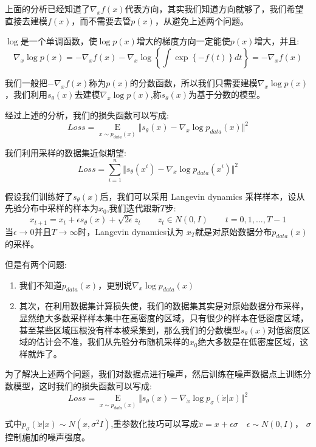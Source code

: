 \documentclass[withoutpreface,bwprint]{cumcmthesis} %
\begin{document}
	上面的分析已经知道了$\nabla_{x} f(x)$代表方向，其实我们知道方向就够了，我们希望直接去建模$f(x)$，而不需要去管$p(x)$，从避免上述两个问题。
	
	$\log$是一个单调函数，使$\log p(x)$增大的梯度方向一定能使$p(x)$增大，并且:
	$$
		\nabla_{x} \log p(x) = - \nabla_x f(x) - \nabla_x \log \left\{ \int \exp \left\{ -f(t) \right\} dt \right\} = - \nabla_{x} f(x) 
	$$
	
	我们一般把$-\nabla_{x} f(x)$称为$p(x)$的分数函数，所以我们只需要建模$\nabla_{x} \log p(x)$，我们利用$s_{\theta}(x)$去建模$\nabla_{x} \log p(x)$,称$s_{\theta}(x)$为基于分数的模型。
	
	经过上述的分析，我们的损失函数可以写成:
	$$
		Loss =  \mathop{E}\limits_{ x \sim p_{data}(x) } \Vert s_{\theta}(x) - \nabla_{x} \log p_{data}(x) \Vert^2
	$$
	
	我们利用采样的数据集近似期望:
	\begin{equation}
		Loss = \sum_{i=1}^{n} \Vert s_{\theta}(x^i) - \nabla_{x} \log p_{data}(x^i) \Vert^2
	\end{equation}

	假设我们训练好了$s_{\theta}(x)$后，我们可以采用 Langevin dynamics 采样样本，设从先验分布中采样的样本为$x_0$,我们迭代跟新$T$步:
	$$
		x_{t+1}=x_{t}+ \epsilon s_{\theta}(x) +\sqrt{2\epsilon} z_t    \quad \quad z_t \in N(0,I)   \quad \quad  t=0,1,...,T-1   
	$$
	当$\epsilon \to 0$并且$T \to \infty $时，Langevin dynamics认为 $x_T$就是对原始数据分布$p_{data}(x)$的采样。
	
	但是有两个问题:
	\begin{enumerate}
		\item 我们不知道$p_{data}(x)$，更别说$\nabla_{x} \log p_{data}(x)$
		\item 其次，在利用数据集计算损失使，我们的数据集其实是对原始数据分布采样，显然绝大多数采样样本集中在高密度的区域，只有很少的样本在低密度区域，甚至某些区域压根没有样本被采集到，那么我们的分数模型$s_{\theta}(x)$对低密度区域的估计会不准，我们从先验分布随机采样的$x_0$绝大多数是在低密度区域，这样就炸了。
	\end{enumerate}	

	为了解决上述两个问题，我们对数据点进行噪声，然后训练在噪声数据点上训练分数模型，这时我们的损失函数可以写成:
	$$
		Loss =  \mathop{E}\limits_{ x \sim p_{data}(x) } \Vert s_{\theta}(x) - \nabla_{\grave{x}} \log p_{\sigma}(\grave{x}|x) \Vert^2
	$$
	
	式中$p_{\sigma}(\grave{x}|x) \sim N(x,\sigma^2 I)$,重参数化技巧可以写成$\grave{x} = x+ \epsilon \sigma  \quad \epsilon \sim N(0,I)$，
	$\sigma$ 控制施加的噪声强度。	
	
\end{document}
